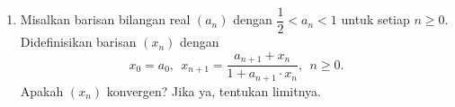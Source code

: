 \documentclass[12pt,twoside]{article}
\begin{document}
\begin{enumerate}
$$\begin{bmatrix}
                  0 \\ 2\\0\\0
              \end{bmatrix}	 \qquad \text{dan} \qquad A\begin{bmatrix}
                  b_{11}+b_{13}+b_{14} \\
                  b_{21}+b_{23}+b_{24}
              \end{bmatrix} =\begin{bmatrix}
                  2 \\0\\2\\2
              \end{bmatrix}. $$
          \begin{enumerate}
              \item Tentukan semua nilai eigen dari matriks $AB$ beserta multiplisitas aljabarnya.
              \item Buktikan bahwa $BA=\begin{bmatrix}
                            2 & 0 \\
                            0 & 2
                        \end{bmatrix}$.
          \end{enumerate}
    \item Misalkan barisan bilangan real $(a_n)$ dengan $\dfrac{1}{2}<a_n<1$ untuk setiap $n\geq 0$. Didefinisikan barisan $(x_n)$ dengan
          $$ x_0=a_0, ~~x_{n+1}= \dfrac{a_{n+1}+x_n}{1+a_{n+1}\cdot x_n}, ~~n\geq 0.$$
          Apakah $(x_n)$ konvergen? Jika ya, tentukan limitnya.
\end{enumerate}
\pagebreak
\end{document}
